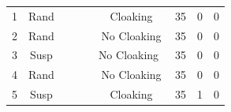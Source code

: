 \documentclass[letterpaper,twocolumn,10pt]{article}
\newcommand{\cmark}{\ding{51}}%
\newcommand{\xmark}{\ding{55}}%
\begin{document}
\begin{table}[t]
{\begin{tabular}{ccccccccc}
\hline
\small{1}  & \small{Rand} & \cmark & \xmark  & \xmark      & \small{Cloaking}                                                                                            & \small{35}                                                                                           & {\cellcolor[rgb]{1,0.49,0.49}}\small{0}                                                                             & {\cellcolor[rgb]{1,0.49,0.49}}\small{0}                                                                           \\
\small{2}  & \small{Rand} & \cmark &\xmark  & \xmark      & \small{No Cloaking}                                                                                            & \small{35}                                                                                           & {\cellcolor[rgb]{1,0.49,0.49}}\small{0}                                                                             & {\cellcolor[rgb]{1,0.49,0.49}}\small{0}                                                                           \\
\small{3}  & \small{Susp} &  \cmark & \xmark  & \xmark      & \small{No Cloaking}~                                                                                        & \small{35}                                                                                          & {\cellcolor[rgb]{1,0.49,0.49}}\small{0}                                                                             & {\cellcolor[rgb]{1,0.49,0.49}}\small{0}                                                                           \\
\small{4}  & \small{Rand} &  \cmark &  \cmark & \xmark      & \small{No Cloaking}                                                                                        &  \small{35}                                                                                           & {\cellcolor[rgb]{1,0.49,0.49}}\small{0}                                                                             & {\cellcolor[rgb]{1,0.49,0.49}}\small{0}                                                                           \\
\small{5}  & \small{Susp} & \cmark & \cmark & \xmark     & \small{Cloaking}                                                                                             & \small{35}                                                                                           & {\cellcolor[rgb]{1,0.49,0.49}}\small{1}                                                                             & {\cellcolor[rgb]{1,0.49,0.49}}\small{0}                                                                           \\

\end{tabular}}
\end{table}
\end{document}
